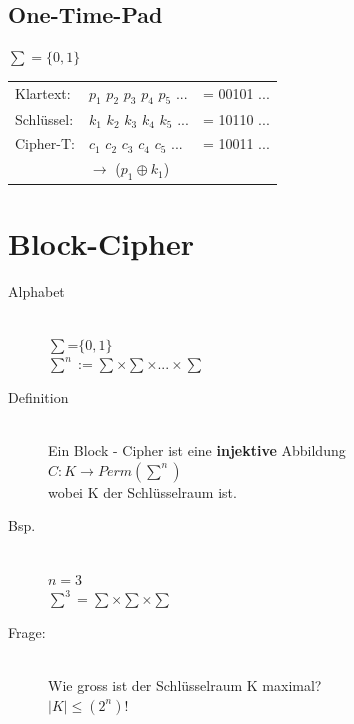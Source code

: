 \documentclass[10pt]{article}
\newcommand{\ra}{\rightarrow}
\begin{document}
\subsection{One-Time-Pad}
$\sum = \{0,1\}$ \\
\begin{tabular}{l l l}
	Klartext: & $p_1$ $p_2$ $p_3$ $p_4$ $p_5$ ... & = 00101 ...  \\
	Schlüssel: & $k_1$ $k_2$ $k_3$ $k_4$ $k_5$ ... & = 10110 ... \\
	Cipher-T: & $c_1$ $c_2$ $c_3$ $c_4$ $c_5$ ... & = 10011 ... \\
	& $\ra$ ($p_1 \oplus k_1$)
\end{tabular}

\newpage
\section{Block-Cipher}
\begin{description}
	\item[Alphabet] \hfill \\
		$\sum$=$\{0,1\}$ \\
		$\sum^n := \sum \times \sum \times ... \times \sum$ 
	\item[Definition] \hfill \\
		Ein Block - Cipher ist eine \textbf{injektive} Abbildung \\
		$C: K \ra Perm(\sum^n)$ \\
		wobei K der Schlüsselraum ist.
	\item[Bsp.] \hfill \\
		$n=3$ \\
		$\sum^3=\sum \times \sum \times \sum$
	\item[Frage:] \hfill \\
		Wie gross ist der Schlüsselraum K maximal? \\
		$|K| \leq (2^n)!$
\end{description}
\end{document}
